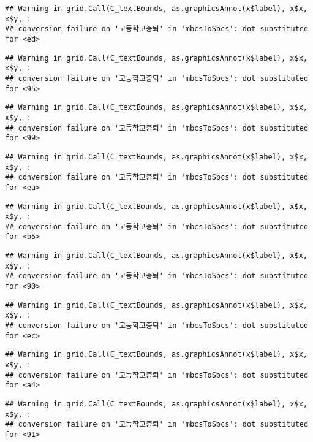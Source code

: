 \documentclass[
]{article}
\begin{document}
\begin{verbatim}
## Warning in grid.Call(C_textBounds, as.graphicsAnnot(x$label), x$x, x$y, :
## conversion failure on '고등학교중퇴' in 'mbcsToSbcs': dot substituted for <ed>
\end{verbatim}

\begin{verbatim}
## Warning in grid.Call(C_textBounds, as.graphicsAnnot(x$label), x$x, x$y, :
## conversion failure on '고등학교중퇴' in 'mbcsToSbcs': dot substituted for <95>
\end{verbatim}

\begin{verbatim}
## Warning in grid.Call(C_textBounds, as.graphicsAnnot(x$label), x$x, x$y, :
## conversion failure on '고등학교중퇴' in 'mbcsToSbcs': dot substituted for <99>
\end{verbatim}

\begin{verbatim}
## Warning in grid.Call(C_textBounds, as.graphicsAnnot(x$label), x$x, x$y, :
## conversion failure on '고등학교중퇴' in 'mbcsToSbcs': dot substituted for <ea>
\end{verbatim}

\begin{verbatim}
## Warning in grid.Call(C_textBounds, as.graphicsAnnot(x$label), x$x, x$y, :
## conversion failure on '고등학교중퇴' in 'mbcsToSbcs': dot substituted for <b5>
\end{verbatim}

\begin{verbatim}
## Warning in grid.Call(C_textBounds, as.graphicsAnnot(x$label), x$x, x$y, :
## conversion failure on '고등학교중퇴' in 'mbcsToSbcs': dot substituted for <90>
\end{verbatim}

\begin{verbatim}
## Warning in grid.Call(C_textBounds, as.graphicsAnnot(x$label), x$x, x$y, :
## conversion failure on '고등학교중퇴' in 'mbcsToSbcs': dot substituted for <ec>
\end{verbatim}

\begin{verbatim}
## Warning in grid.Call(C_textBounds, as.graphicsAnnot(x$label), x$x, x$y, :
## conversion failure on '고등학교중퇴' in 'mbcsToSbcs': dot substituted for <a4>
\end{verbatim}

\begin{verbatim}
## Warning in grid.Call(C_textBounds, as.graphicsAnnot(x$label), x$x, x$y, :
## conversion failure on '고등학교중퇴' in 'mbcsToSbcs': dot substituted for <91>
\end{verbatim}
\end{document}

